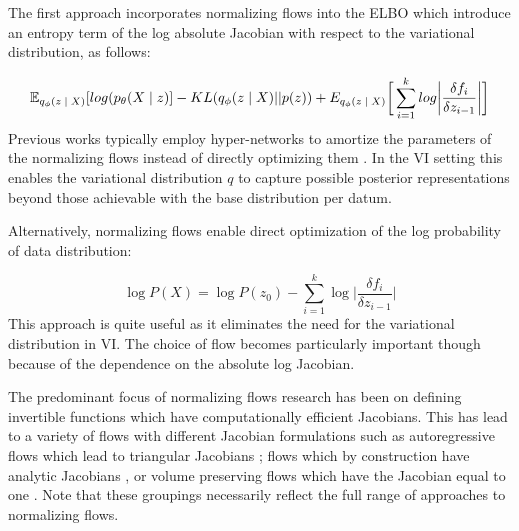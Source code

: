 


The first approach incorporates normalizing flows into the \ac{ELBO} which introduce an entropy term of the log absolute Jacobian with respect to the variational distribution, as follows:

\begin{equation}
\operatorname{\mathbb{E}}_{q_{\phi}(z \; | \;{X})} [ log(p_{\theta}(X \; | \;{z}) ]  - KL(q_{\phi}(z \; | \;{X}) || p(z)) + E_{q_{\phi}(z\; | \;{X})}\bigg[\sum_{i=1}^{k}log \bigg|\frac{\delta f_{i}}{\delta z_{i-1}}\bigg|\bigg]
\end{equation}
Previous works typically employ hyper-networks \cite{ha2016hypernets} to amortize the parameters of the normalizing flows instead of directly optimizing them  \cite{rezende2015VIwithNF,tomczak2016Householder,vdberg2018sylvester}. In the \ac{VI} setting this enables the variational distribution $q$ to capture possible posterior representations beyond those achievable with the base distribution per datum.

Alternatively, normalizing flows enable direct optimization of the  log probability of  data distribution:
 
\begin{equation}
	\log P(X) = \log P(z_{0}) - \sum_{i=1}^{k} \log \bigg| \frac{\delta f_{i}}{\delta z_{i-1}} \bigg|
\end{equation}
This approach is quite useful as it eliminates the need for the variational distribution in \ac{VI}. The choice of flow becomes particularly important though because of the dependence on the absolute log Jacobian. %

The predominant focus of normalizing flows research has been on defining invertible functions which have computationally efficient Jacobians. This has lead to a variety of flows with different Jacobian formulations such as autoregressive flows which lead to triangular Jacobians \cite{kingma2016IAF, papamakarios2017MAF}; flows which by construction have analytic Jacobians \cite{rezende2015VIwithNF,vdberg2018sylvester}, or volume preserving flows which have the Jacobian equal to one \cite{tomczak2016Householder,tran2019discreteflows,hoogeboom2019IntegerDiscreteFlows}. Note that these groupings necessarily reflect the full range of approaches to normalizing flows.



